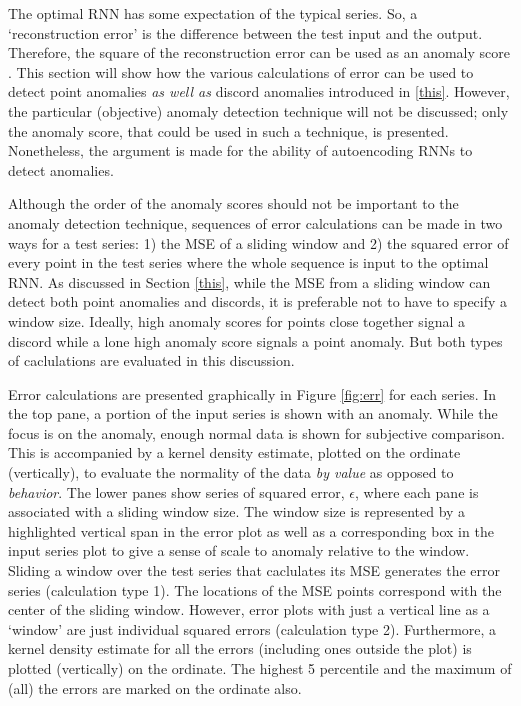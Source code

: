 The optimal RNN has some expectation of the typical series.
%
So, a `reconstruction error' is the difference between the test input and the output.
%
Therefore, the square of the reconstruction error can be used as an anomaly score \cite{Erfani2014}.
%
This section will show how the various calculations of error can be used to detect point anomalies \emph{as well as} discord anomalies introduced in \ref{this}.
%
However, the particular (objective) anomaly detection technique will not be discussed;
only the anomaly score, that could be used in such a technique, is presented.
%
Nonetheless, the argument is made for the ability of autoencoding RNNs to detect anomalies.


Although the order of the anomaly scores should not be important to the anomaly detection technique, sequences of error calculations can be made in two ways for a test series: 1) the MSE of a sliding window and 2) the squared error of every point in the test series where the whole sequence is input to the optimal RNN.
%
As discussed in Section \ref{this}, while the MSE from a sliding window can detect both point anomalies and discords, it is preferable not to have to specify a window size.
%
Ideally, high anomaly scores for points close together signal a discord while a lone high anomaly score signals a point anomaly.
%
But both types of caclulations are evaluated in this discussion.


Error calculations are presented graphically in Figure \ref{fig:err} for each series.
%
In the top pane, a portion of the input series is shown with an anomaly.
%
While the focus is on the anomaly, enough normal data is shown for subjective comparison.
%
This is accompanied by a kernel density estimate, plotted on the ordinate (vertically), to evaluate the normality of the data \emph{by value} as opposed to \emph{behavior}.
%
The lower panes show series of squared error, $\epsilon$, where each pane is associated with a sliding window size.
%
The window size is represented by a highlighted vertical span in the error plot as well as a corresponding box in the input series plot to give a sense of scale to anomaly relative to the window.
%
Sliding a window over the test series that caclulates its MSE generates the error series (calculation type 1).
%
The locations of the MSE points correspond with the center of the sliding window.
%
However, error plots with just a vertical line as a `window' are just individual squared errors (calculation type 2).
%
Furthermore, a kernel density estimate for all the errors (including ones outside the plot) is plotted (vertically) on the ordinate.
%
The highest 5 percentile and the maximum of (all) the errors are marked on the ordinate also.


